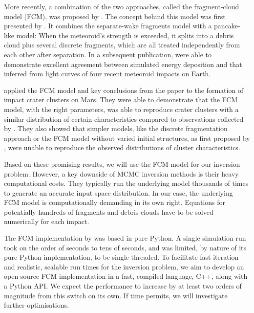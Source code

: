 More recently, a combination of the two approaches, called the fragment-cloud model (FCM), was proposed by \cite{wheeler2017fragmentcloud}.
The concept behind this model was first presented by \cite{mehta2015break}.
It combines the separate-wake fragments model \citep{passey1980effects,artemieva1996interaction} with a pancake-like model:
When the meteoroid's strength is exceeded, it splits into a debris cloud plus several discrete fragments, which are all treated independently from each other after separation.
In a subsequent publication, \cite{wheeler2018atmospheric} were able to demonstrate excellent agreement between simulated energy deposition and that inferred from light curves of four recent meteoroid impacts on Earth.

\cite{newland2019CFM18} applied the FCM model and key conclusions from the \cite{wheeler2018atmospheric} paper to the formation of impact crater clusters on Mars.
They were able to demonstrate that the FCM model, with the right parameters, was able to reproduce crater clusters with a similar distribution of certain characteristics compared to observations collected by \cite{daubar2019recently}.
They also showed that simpler models, like the discrete fragmentation approach or the FCM model without varied initial structures, as first proposed by \cite{wheeler2017fragmentcloud}, were unable to reproduce the observed distributions of cluster characteristics.

Based on these promising results, we will use the FCM model for our inversion problem.
However, a key downside of MCMC inversion methods is their heavy computational costs.
They typically run the underlying model thousands of times to generate an accurate input space distribution.
In our case, the underlying FCM model is computationally demanding in its own right.
Equations for potentially hundreds of fragments and debris clouds have to be solved numerically for each impact.

The FCM implementation by \cite{newland2019CFM18} was based in pure Python.
A single simulation run took on the order of seconds to tens of seconds, and was limited, by nature of its pure Python implementation, to be single-threaded.
To facilitate fast iteration and realistic, scalable run times for the inversion problem, we aim to develop an open source FCM implementation in a fast, compiled language, C++, along with a Python API.
We expect the performance to increase by at least two orders of magnitude from this switch on its own.
If time permits, we will investigate further optimisations.
